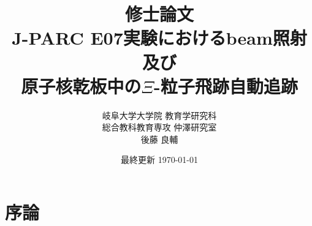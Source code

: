 \documentclass[12pt,a4paper]{jarticle}
\begin{document}
\begin{titlepage}
\title{\vspace{60mm} \LARGE 修士論文\vspace{10mm}\\J-PARC E07実験におけるbeam照射及び\\原子核乾板中の$\Xi$-粒子飛跡自動追跡}
\author{\Large 岐阜大学大学院 教育学研究科 \\ \vspace{5mm}
\Large 総合教科教育専攻 仲澤研究室 \\ \vspace{5mm}
\LARGE 後藤 良輔}
\date{最終更新 \today}
\maketitle
\thispagestyle{empty} %
\end{titlepage}

\thispagestyle{empty} %
\tableofcontents
\newpage
\section{序論}
\end{document}

